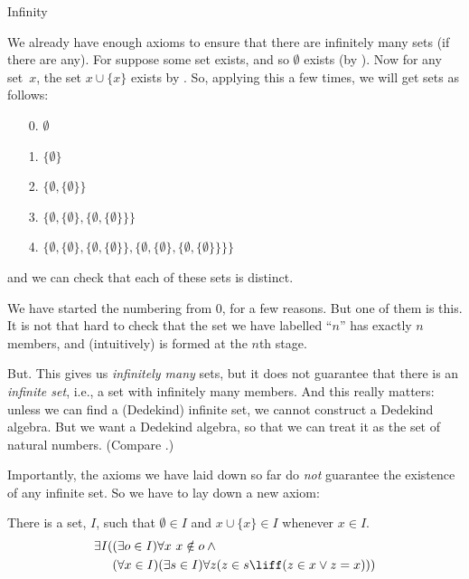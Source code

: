 \documentclass[../../../include/open-logic-section]{subfiles}
\begin{document}
	{Infinity}

We already have enough axioms to ensure that there are infinitely many
sets (if there are any). For suppose some set exists, and so
$\emptyset$ exists (by ). Now for
any set~$x$, the set $x \cup \{x\}$ exists by
. So, applying this a few
times, we will get sets as follows:
\begin{enumerate}
	\item[0.] $\emptyset$ %
	\item[1.] $ \{\emptyset\}$ %
	\item[2.] $\{\emptyset, \{\emptyset\}\}$ %
	\item[3.] $\{\emptyset, \{\emptyset\}, \{\emptyset, \{\emptyset\}\}\}$ %
	\item[4.] $\{\emptyset, \{\emptyset\}, \{\emptyset, \{\emptyset\}\}, \{\emptyset, \{\emptyset\}, \{\emptyset, \{\emptyset\}\}\}\}$%
\end{enumerate}
and we can check that each of these sets is distinct. 

We have started the numbering from $0$, for a few reasons. But one of
them is this. It is not that hard to check that the set we have
labelled ``$n$'' has exactly $n$ members, and (intuitively) is formed
at the $n$th stage. 

But. This gives us \emph{infinitely many} sets, but it does not
guarantee that there is an \emph{infinite set}, i.e., a set with
infinitely many members. And this really matters: unless we can find a
(Dedekind) infinite set, we cannot construct a Dedekind algebra. But
we want a Dedekind algebra, so that we can treat it as the set of
natural numbers. (Compare
.)

Importantly, the axioms we have laid down so far do \emph{not}
guarantee the existence of any infinite set. So we have to lay down a
new axiom:

\begin{axiom}[Infinity]
There is a set, $I$, such that $\emptyset \in I$ and $x \cup \{x\} \in I$ whenever $x \in I$.
\begin{align*}
	\exists I( & (\exists o \in I)\forall x\ x \notin o \land {}\\
	& (\forall x \in I)(\exists s \in I)\forall z(z \in s \liff (z \in x \lor z = x)))
\end{align*}
\end{axiom}
\end{document}
